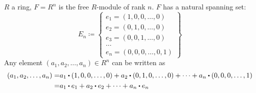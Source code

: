 \documentclass[../Main.tex]{subfiles}
\begin{document}
\begin{example}
	$R$ a ring, $F=R^n$ is the free $R$-module of rank $n$. $F$ has a natural spanning set:
	\[E_n \coloneqq \begin{Bmatrix}
		e_1=(1,0,0,\dots,0)\\
		e_2=(0,1,0,\dots,0)\\
		e_3=(0,0,1,\dots,0)\\
		\dots\\
		e_n=(0,0,0,\dots,0,1)
	\end{Bmatrix}\]
	Any element $(a_1,a_2,\dots,a_n)\in R^n$ can be written as
	\begin{align*}
		(a_1,a_2,\dots,a_n)=&a_1\rdot (1,0,0,\dots,0)+a_2\rdot (0,1,0,\dots,0) + \dots + a_n \rdot (0,0,0,\dots,1)\\
		=& a_1\rdot e_1+a_2\rdot e_2+\dots+a_n\rdot e_n
	\end{align*}
\end{example}
\end{document}
